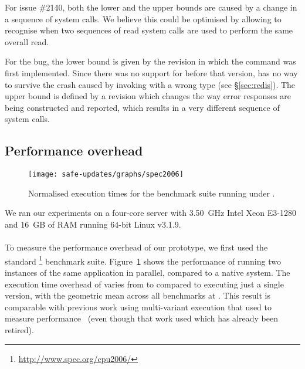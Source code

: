 For \lighttpd issue \#2140, both the lower and the upper bounds are
caused by a change in a sequence of  system calls.  We
believe this could be optimised by allowing \mx to recognise when two
sequences of read system calls are used to perform the same overall
read.


For the \redis bug, the lower bound is given by the revision in which the
 command was first implemented.  Since there was no support for
 before that version, \mx has no way to survive the crash caused
by invoking  with a wrong type (see \S\ref{sec:redis}).  The
upper bound is defined by a revision which changes the way error responses are
being constructed and reported, which results in a very different sequence of
system calls.



\subsection{Performance overhead}
\label{sec:performance}

\begin{figure}[!t]
\centering
\texttt{[image: safe-updates/graphs/spec2006]}
\caption{Normalised execution times for the \speczerosix benchmark suite
running under \mx.}
\label{fig:spec}
\end{figure}

We ran our experiments on a four-core server with 3.50~GHz Intel
Xeon E3-1280 and 16~GB of RAM running 64-bit Linux v3.1.9.

\paragraph{\speczerosix}
To measure the performance overhead of our prototype, we first used the
standard \speczerosix\footnote{\url{http://www.spec.org/cpu2006/}}
benchmark suite.  Figure~\ref{fig:spec} shows the performance of \mx
running two instances of the same application in parallel, compared to a
native system. The execution time overhead of \mx varies from
\minOverSPEC to \maxOverSPEC compared to executing just a single
version, with the geometric mean across all \numSPECbench benchmarks at
\avgOverSPEC. This result is comparable with previous work using
multi-variant execution that used \speccpu to measure
performance~\cite{orchestra09} (even though that work used \speczerozero
which has already been retired).

